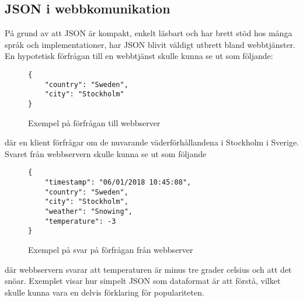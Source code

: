 \documentclass[swedish]{kththesis}
\begin{document}
\subsection{JSON i webbkomunikation}
\label{sec:intr:bakgrund:json-web}
På grund av att JSON är kompakt, enkelt läsbart och har brett stöd hos många språk och implementationer, har JSON blivit väldigt utbrett bland webbtjänster. En hypotetisk förfrågan till en webbtjänst skulle kunna se ut som följande:

\begin{figure}[h]
	\begin{verbatim}
{
	"country": "Sweden",
	"city": "Stockholm"
}
	\end{verbatim}
	\vspace{-1.5em}
	\caption{Exempel på förfrågan till webbserver}
\end{figure}

\noindent
där en klient förfrågar om de nuvarande väderförhållandena i Stockholm i Sverige. Svaret från webbservern skulle kunna se ut som följande

\begin{figure}[h]
	\begin{verbatim}
{
	"timestamp": "06/01/2018 10:45:08",
	"country": "Sweden",
	"city": "Stockholm",
	"weather": "Snowing",
	"temperature": -3
}
	\end{verbatim}
	\vspace{-1.5em}
	\caption{Exempel på svar på förfrågan från webbserver}
\end{figure}

\noindent
där webbservern svarar att temperaturen är minus tre grader celsius och att det snöar. Exemplet visar hur simpelt JSON som dataformat är att förstå, vilket skulle kunna vara en delvis förklaring för populariteten.


\end{document}
